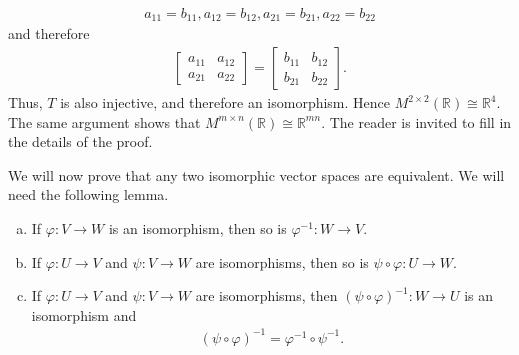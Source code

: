 \documentclass[12pt,letterpaper,reqno]{article}
\numberwithin{equation}{section}
\newcommand{\R}{\ensuremath{\mathbb R}}
\begin{document}
{\begin{solution}
\begin{align*}
	a_{11}=b_{11}, a_{12}=b_{12}, a_{21}=b_{21}, a_{22}=b_{22}
\end{align*}
and therefore
\begin{align*}
	\begin{bmatrix}
	a_{11} & a_{12} \\
	a_{21} & a_{22}
\end{bmatrix}=\begin{bmatrix}
	b_{11} & b_{12} \\
	b_{21} & b_{22}
\end{bmatrix}.
\end{align*}
Thus, $T$ is also injective, and therefore an isomorphism. Hence $M^{2 \times 2}(\R) \cong \R^4$. The same argument shows that $M^{m \times n}(\R) \cong \R^{mn}$. The reader is invited to fill in the details of the proof.
\end{solution}}

We will now prove that any two isomorphic vector spaces are equivalent. We will need the following lemma.

\begin{lem}\label{lem:inverse_and_composition_of_isomorphisms} \hspace{15cm}
\begin{enumerate}[(a)]
	\item If $\varphi:V \to W$ is an isomorphism, then so is $\varphi^{-1}:W \to V$.
	\item If $\varphi:U \to V$ and $\psi:V \to W$ are isomorphisms, then so is $\psi \circ \varphi: U \to W$.
	\item If $\varphi:U \to V$ and $\psi:V \to W$ are isomorphisms, then $(\psi \circ \varphi)^{-1}:W \to U$ is an isomorphism and 
	\begin{align*}
		(\psi \circ \varphi)^{-1}=\varphi^{-1} \circ \psi^{-1}.
	\end{align*}
\end{enumerate}
\end{lem}
\end{document}
